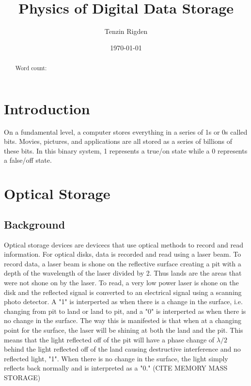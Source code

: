 \documentclass[ aip, 12pt]{revtex4-1} %
\begin{document}
\title{Physics of Digital Data Storage}
\author{Tenzin Rigden}
\date{\today}

\begin{abstract}
Word count: 
\end{abstract}

\maketitle
\section{Introduction}
On a fundamental level, a computer stores everything in a series of 1s or 0s called bits. Movies, pictures, and applications are all stored as a series of billions of these bits. In this binary system, 1 represents a true/on state while a 0 represents a false/off state. 



\section{Optical Storage}
\subsection{Background}
Optical storage devices are devicecs that use optical methods to record and read information. For optical disks, data is recorded and read using a laser beam. To record data, a laser beam is shone on the reflective surface creating a pit with a depth of the wavelength of the laser divided by 2. Thus lands are the areas that were not shone on by the laser. To read, a very low power laser is shone on the disk and the reflected signal is converted to an electrical signal using a scanning photo detector. A "1" is interperted as when there is a change in the surface, i.e. changing from pit to land or land to pit, and a "0" is interperted as when there is no change in the surface. The way this is manifested is that when at a changing point for the surface, the laser will be shining at both the land and the pit. This means that the light reflected off of the pit will have a phase change of $\lambda/2$ behind the light reflected off of the land causing destructive interference and no reflected light, "1". When there is no change in the surface, the light simply reflects back normally and is interpreted as a "0." (CITE MEMORY MASS STORAGE)
\end{document}
